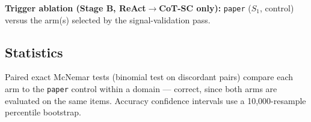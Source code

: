 \textbf{Trigger ablation (Stage B, ReAct$\to$CoT-SC only):} \texttt{paper}
($S_1$, control) versus the arm(s) selected by the signal-validation pass.

\subsection{Statistics}
Paired exact McNemar tests (binomial test on discordant pairs) compare
each arm to the \texttt{paper} control within a domain --- correct, since
both arms are evaluated on the same items. Accuracy confidence intervals
use a 10{,}000-resample percentile bootstrap.
